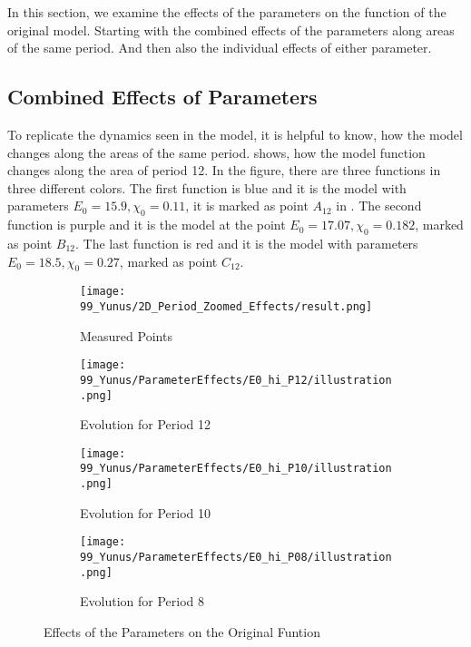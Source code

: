 In this section, we examine the effects of the parameters on the function of the original model.
Starting with the combined effects of the parameters along areas of the same period.
And then also the individual effects of either parameter.

\subsection{Combined Effects of Parameters}
\label{sec:yunus.param.effects.combined}

To replicate the dynamics seen in the model, it is helpful to know, how the model changes along the areas of the same period.
 shows, how the model function changes along the area of period 12.
In the figure, there are three functions in three different colors.
The first function is blue and it is the model with parameters $E_0 = 15.9, \chi_0 = 0.11$, it is marked as point $A_12$ in .
The second function is purple and it is the model at the point $E_0 = 17.07, \chi_0 = 0.182$, marked as point $B_{12}$.
The last function is red and it is the model with parameters $E_0 = 18.5, \chi_0 = 0.27$, marked as point $C_{12}$.

\begin{figure}
	\centering
	\begin{subfigure}{0.4\textwidth}
		\texttt{[image: 99\_Yunus/2D\_Period\_Zoomed\_Effects/result.png]}
		\caption{Measured Points}
		\label{fig:yunus.function.evolution.map}
	\end{subfigure}
	\begin{subfigure}{0.4\textwidth}
		\texttt{[image: 99\_Yunus/ParameterEffects/E0\_hi\_P12/illustration.png]}
		\caption{Evolution for Period 12}
		\label{fig:yunus.function.evolution.12}
	\end{subfigure}
	\begin{subfigure}{0.4\textwidth}
		\texttt{[image: 99\_Yunus/ParameterEffects/E0\_hi\_P10/illustration.png]}
		\caption{Evolution for Period 10}
		\label{fig:yunus.function.evolution.10}
	\end{subfigure}
	\begin{subfigure}{0.4\textwidth}
		\texttt{[image: 99\_Yunus/ParameterEffects/E0\_hi\_P08/illustration.png]}
		\caption{Evolution for Period 8}
		\label{fig:yunus.function.evolution.08}
	\end{subfigure}
	\caption{Effects of the Parameters on the Original Funtion}
\end{figure}

